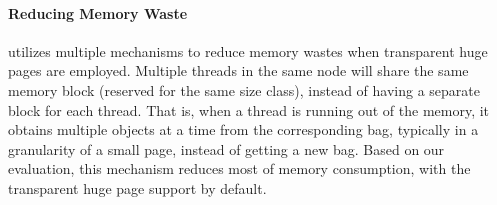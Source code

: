 \paragraph{Reducing Memory Waste} \NM{} utilizes multiple mechanisms to reduce memory wastes when transparent huge pages are employed.  Multiple threads in the same node will share the same memory block (reserved for the same size class), instead of having a separate block for each thread.  That is, when  a thread is running out of the memory, it obtains multiple objects at a time from the corresponding bag, typically in a granularity of a small page, instead of getting a new bag. Based on our evaluation, this mechanism reduces most of memory consumption, with the transparent huge page support by default.  





